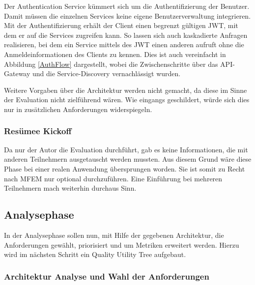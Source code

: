 
Der Authentication Service kümmert sich um die Authentifizierung der Benutzer. Damit müssen die einzelnen Services keine eigene Benutzerverwaltung integrieren. Mit der Authentifizierung erhält der Client einen begrenzt gültigen \ac{JWT}, mit dem er auf die Services zugreifen kann. So lassen sich auch kaskadierte Anfragen realisieren, bei dem ein Service mittels des \ac{JWT} einen anderen aufruft ohne die Anmeldeinformationen des Clients zu kennen. Dies ist auch vereinfacht in Abbildung \ref{AuthFlow} dargestellt, wobei die Zwischenschritte über das API-Gateway und die Service-Discovery vernachlässigt wurden.


Weitere Vorgaben über die Architektur werden nicht gemacht, da diese im Sinne der Evaluation nicht zielführend wären. Wie eingangs geschildert, würde sich dies nur in zusätzlichen Anforderungen widerspiegeln.

\subsubsection{Resümee Kickoff}

Da nur der Autor die Evaluation durchführt, gab es keine Informationen, die mit anderen Teilnehmern ausgetauscht werden mussten. Aus diesem Grund wäre diese Phase bei einer realen Anwendung übersprungen worden. Sie ist somit zu Recht nach \ac{MFEM} nur optional durchzuführen. Eine Einführung bei mehreren Teilnehmern mach weiterhin durchaus Sinn.

\subsection{Analysephase}

In der Analysephase sollen nun, mit Hilfe der gegebenen Architektur, die Anforderungen gewählt, priorisiert und um Metriken erweitert werden. Hierzu wird im nächsten Schritt ein Quality Utility Tree aufgebaut.

\subsubsection{Architektur Analyse und Wahl der Anforderungen}

